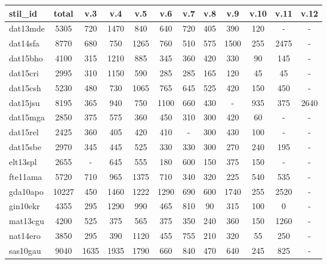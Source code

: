 \documentclass[paper=a4, fontsize=11pt,twoside]{article}
\begin{document}
\begin{tabular}{|l|c|c|c|c|c|c|c|c|c|c|c|}
\hline
{\fontsize{8pt}{0.2cm}\selectfont stil\_id} & {\fontsize{8pt}{0.2cm}\selectfont
total} & {\fontsize{8pt}{0.2cm}\selectfont v.3} &
{\fontsize{8pt}{0.2cm}\selectfont v.4} & {\fontsize{8pt}{0.2cm}\selectfont v.5}
& {\fontsize{8pt}{0.2cm}\selectfont v.6} & {\fontsize{8pt}{0.2cm}\selectfont v.7}
& {\fontsize{8pt}{0.2cm}\selectfont v.8} & {\fontsize{8pt}{0.2cm}\selectfont v.9}
& {\fontsize{8pt}{0.2cm}\selectfont v.10} & {\fontsize{8pt}{0.2cm}\selectfont
v.11} & {\fontsize{8pt}{0.2cm}\selectfont v.12} \\
\hline
dat13mde & 5305 & 720 & 1470 & 840 & 640 & 720 & 405 & 390 & 120 & - & - \\
\hline
dat14sfa & 8770 & 680 & 750 & 1265 & 760 & 510 & 575 & 1500 & 255 & 2475 & - \\
\hline
dat15bho & 4100 & 315 & 1210 & 885 & 345 & 360 & 420 & 330 & 90 & 145 & - \\
\hline
dat15cri & 2995 & 310 & 1150 & 590 & 285 & 285 & 165 & 120 & 45 & 45 & - \\
\hline
dat15csh & 5230 & 480 & 730 & 1065 & 765 & 645 & 525 & 420 & 150 & 450 & - \\
\hline
dat15jsu & 8195 & 365 & 940 & 750 & 1100 & 660 & 430 & - & 935 & 375 & 2640 \\
\hline
dat15mga & 2850 & 375 & 575 & 360 & 450 & 310 & 300 & 420 & 60 & - & - \\
\hline
dat15rel & 2425 & 360 & 405 & 420 & 410 & - & 300 & 430 & 100 & - & - \\
\hline
dat15sbe & 2970 & 345 & 445 & 525 & 330 & 330 & 300 & 270 & 240 & 195 & - \\
\hline
elt13spl & 2655 & - & 645 & 555 & 180 & 600 & 150 & 375 & 150 & - & - \\
\hline
fte11ama & 5720 & 710 & 965 & 1375 & 710 & 340 & 320 & 225 & 540 & 535 & - \\
\hline
gda10apo & 10227 & 450 & 1460 & 1222 & 1290 & 690 & 600 & 1740 & 255 & 2520 & -
\\
\hline
gin10ekr & 4355 & 295 & 1290 & 990 & 465 & 810 & 90 & 315 & 100 & 0 & - \\
\hline
mat13cgu & 4200 & 525 & 375 & 565 & 375 & 350 & 240 & 360 & 150 & 1260 & - \\
\hline
nat14ero & 3850 & 295 & 390 & 1120 & 455 & 755 & 210 & 320 & 55 & 250 & - \\
\hline
sas10gau & 9040 & 1635 & 1935 & 1790 & 660 & 840 & 470 & 640 & 245 & 825 & -\\
\hline
\end{tabular}
\end{document}
